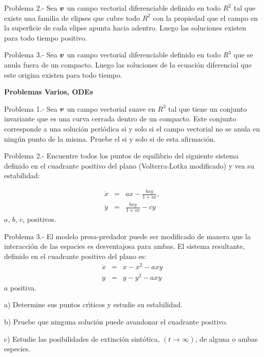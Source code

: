 \documentclass{article}
\newcommand{\ve}[1]{\mbox{\boldmath ${#1}$}}
\begin{document}
Problema 2.- Sea $\ve{v}$ un campo vectorial diferenciable definido en todo  
$R^2$ tal que existe una familia de elipses que cubre todo $R^2$ con la 
propiedad que el campo en la superficie de cada elipse apunta hacia adentro.
Luego las soluciones existen para todo tiempo positivo.

Problema 3.- Sea $\ve{v}$ un campo vectorial diferenciable definido en todo
$R^3$ que se anula fuera de un compacto. Luego las soluciones de la ecuaci\'on diferencial que este origina existen para todo tiempo.


\begin{center}
  \textbf{Problemas Varios, ODEs}
\end{center}

Problema 1.-
Sea $\ve{v}$ un campo vectorial suave en $R^3$ tal que tiene un conjunto invariante
que es una curva cerrada dentro de un compacto. 
Este conjunto corresponde a una soluci\'on peri\'odica si y solo si el campo vectorial no se anula en ning\'un punto de la misma.
Pruebe el si y solo si de esta afirmaci\'on.

Problema 2.- 
Encuentre todos los puntos de equilibrio del siguiente sistema  definido en el cuadrante positivo del plano (Volterra-Lotka modificado) y vea su estabilidad:

\begin{eqnarray}
  \dot{x} & = & a x -  \frac{b x y}{1+s x}, \nonumber \\
  \dot{y} & = & \frac{b x y}{1+sx} -cy 
\end{eqnarray}
$a$, $b$, $c$, positivos.


Problema 3.-
El modelo presa-predador puede ser modificado de manera que la interacci\'on
de las espacies es desventajosa para ambas. El sistema resultante, definido
en el cuadrante positivo del plano es:
\begin{eqnarray}
  \dot{x} & = &  x -  x^2 - axy  \nonumber \\
  \dot{y} & = &  y - y^2 -axy
\end{eqnarray}
$a$ positiva.

a) Determine sus puntos cr\'\i{}ticos y estudie su estabilidad.

b) Pruebe que ninguna soluci\'on puede avandonar el cuadrante positivo.

c) Estudie las posibilidades de extinci\'on sint\'otica, $(t \to \infty)$,
de alguna o ambas especies.
\end{document}
